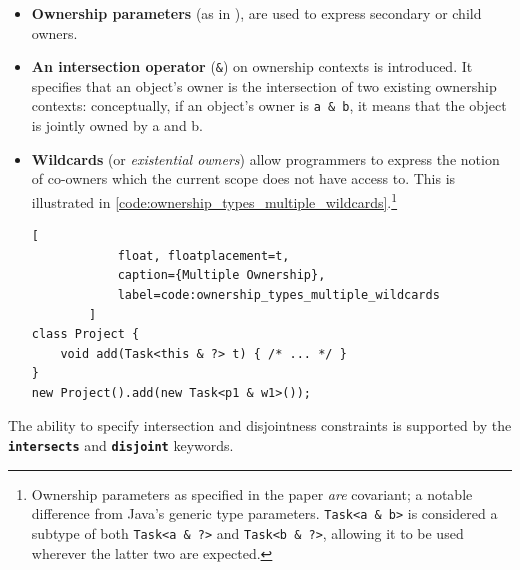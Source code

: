 \documentclass{acm_proc_article-sp}
\begin{document}
\begin{itemize}

	\item \textbf{Ownership parameters} (as in \cite{boyapati04safejava}), are
		used to express secondary or child owners.

	\item \textbf{An intersection operator} (\lstinline|&|) on ownership
		contexts is introduced. It specifies that an object's owner is the
		intersection of two existing ownership contexts: conceptually, if an
		object's owner is \lstinline|a & b|, it means that the object is jointly
		owned by a and b.

	\item \textbf{Wildcards} (or \textit{existential owners}) allow programmers
		to express the notion of co-owners which the current scope does not
		have access to. This is illustrated in
		\cref{code:ownership_types_multiple_wildcards}.\footnote{Ownership
		parameters as specified in the paper \textit{are} covariant; a
		notable difference from Java's generic type parameters.\linebreak
		\lstinline|Task<a & b>| is considered a subtype of both
		\lstinline|Task<a & ?>| and \lstinline|Task<b & ?>|, allowing it to be
		used wherever the latter two are expected.}

		\begin{lstlisting}[
			float, floatplacement=t,
			caption={Multiple Ownership},
			label=code:ownership_types_multiple_wildcards
		]
class Project {
	void add(Task<this & ?> t) { /* ... */ }
}
new Project().add(new Task<p1 & w1>());
		\end{lstlisting}

\end{itemize}

The ability to specify intersection and disjointness constraints is supported
by the \textbf{\lstinline|intersects|} and \textbf{\lstinline|disjoint|}
keywords.
\end{document}
